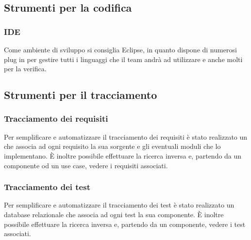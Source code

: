 \subsection{Strumenti per la codifica}
\subsubsection{IDE}
Come ambiente di sviluppo si consiglia Eclipse, in quanto dispone di numerosi plug in per gestire tutti i linguaggi che il team andrà ad utilizzare e anche molti per la verifica.


\subsection{Strumenti per il tracciamento}

\subsubsection{Tracciamento dei requisiti}
\label{}
Per semplificare e automatizzare il tracciamento dei requisiti è stato realizzato un   che associa ad ogni requisito la sua sorgente e gli eventuali moduli che lo implementano. È inoltre possibile effettuare la ricerca inversa e, partendo da un componente od un use case, vedere i requisiti associati.

\subsubsection{Tracciamento dei test}
\label{}
Per semplificare e automatizzare il tracciamento dei test è stato realizzato un database relazionale che associa ad ogni test la sua componente. È inoltre possibile effettuare la ricerca inversa e, partendo da un componente, vedere i test associati.

\appendix
